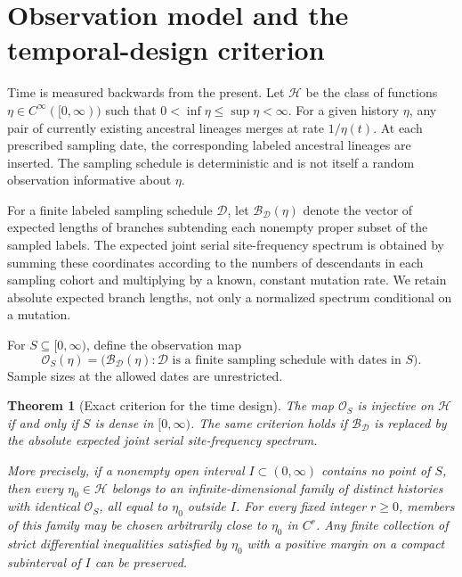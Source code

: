 \documentclass[11pt]{article}
\newtheorem{theorem}{Theorem}[section]
\theoremstyle{definition}
\theoremstyle{remark}
\numberwithin{equation}{section}
\begin{document}
\section{Observation model and the temporal-design criterion}
\label{sec:model}

Time is measured backwards from the present. Let $\mathcal H$ be the
class of functions $\eta\in C^\infty([0,\infty))$ such that
$0<\inf\eta\le\sup\eta<\infty$. For a given history $\eta$, any pair
of currently existing ancestral lineages merges at rate $1/\eta(t)$.
At each prescribed sampling date, the corresponding labeled ancestral
lineages are inserted. The sampling schedule is deterministic and is
not itself a random observation informative about $\eta$.

For a finite labeled sampling schedule $\mathcal D$, let
$\mathcal B_{\mathcal D}(\eta)$ denote the vector of expected lengths
of branches subtending each nonempty proper subset of the sampled labels.
The expected joint serial site-frequency spectrum is obtained by summing
these coordinates according to the numbers of descendants in each
sampling cohort and multiplying by a known, constant mutation rate.
We retain absolute expected branch lengths, not only a normalized
spectrum conditional on a mutation.

For $S\subseteq[0,\infty)$, define the observation map
\[
 \mathcal O_S(\eta)=
 \bigl(\mathcal B_{\mathcal D}(\eta):
        \mathcal D\text{ is a finite sampling schedule with dates in }S\bigr).
\]
Sample sizes at the allowed dates are unrestricted.

\begin{theorem}[Exact criterion for the time design]\label{phy:design}
The map $\mathcal O_S$ is injective on $\mathcal H$ if and only if
$S$ is dense in $[0,\infty)$.
The same criterion holds if $\mathcal B_{\mathcal D}$ is replaced by
the absolute expected joint serial site-frequency spectrum.

More precisely, if a nonempty open interval $I\subset(0,\infty)$
contains no point of $S$, then every $\eta_0\in\mathcal H$ belongs
to an infinite-dimensional family of distinct histories with identical
$\mathcal O_S$, all equal to $\eta_0$ outside $I$. For every fixed
integer $r\ge0$, members of this family may be chosen arbitrarily
close to $\eta_0$ in $C^r$. Any finite collection of strict differential
inequalities satisfied by $\eta_0$ with a positive margin on a compact
subinterval of $I$ can be preserved.
\end{theorem}
\end{document}
